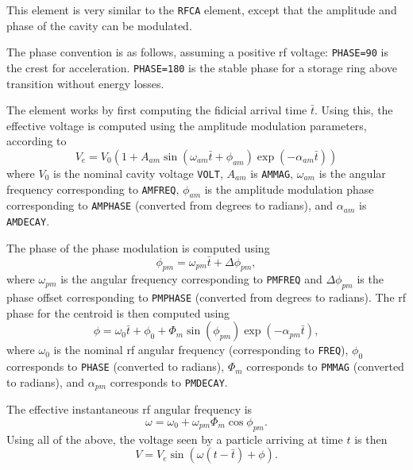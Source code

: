 This element is very similar to the \verb|RFCA| element, except that the
amplitude and phase of the cavity can be modulated.

The phase convention is as follows, assuming a positive rf voltage:
\verb|PHASE=90| is the crest for acceleration.  \verb|PHASE=180| is the stable
phase for a storage ring above transition without energy losses.

The element works by first computing the fidicial arrival time $\bar{t}$.
Using this, the effective voltage is computed using the amplitude modulation parameters, according to
\begin{equation}
V_e = V_0 ( 1 + A_{am} \sin (\omega_{am} \bar{t} + \phi_{am}) \exp (-\alpha_{am} \bar{t}))
\end{equation}
where $V_0$ is the nominal cavity voltage \verb|VOLT|, $A_{am}$ is \verb|AMMAG|, $\omega_{am}$ is the
angular frequency corresponding to \verb|AMFREQ|, $\phi_{am}$ is the amplitude modulation phase
corresponding to \verb|AMPHASE| (converted from degrees to radians), and $\alpha_{am}$ is \verb|AMDECAY|.

The phase of the phase modulation is computed  using
\begin{equation}
\phi_{pm} = \omega_{pm} \bar{t} + \Delta\phi_{pm},
\end{equation}
where $\omega_{pm}$ is the angular frequency corresponding to \verb|PMFREQ| and 
$\Delta\phi_{pm}$ is the phase offset corresponding to \verb|PMPHASE| (converted from degrees to radians).
The rf phase for the centroid is then computed using
\begin{equation}
\phi = \omega_0\bar{t} + \phi_0 + \Phi_m \sin(\phi_{pm}) \exp (-\alpha_{pm}\bar{t}),
\end{equation}
where $\omega_0$ is the nominal rf angular frequency (corresponding to \verb|FREQ|), $\phi_0$ corresponds to
\verb|PHASE| (converted to radians), $\Phi_m$ corresponds to \verb|PMMAG| (converted to radians), and 
$\alpha_{pm}$ corresponds to \verb|PMDECAY|.

The effective instantaneous rf angular frequency is 
\begin{equation}
\omega = \omega_0 + \omega_{pm}\Phi_m \cos \phi_{pm}.
\end{equation}
Using all of the above, the voltage seen by a particle arriving at time $t$ is then
\begin{equation}
V = V_e \sin (\omega (t - \bar{t}) + \phi).
\end{equation}
